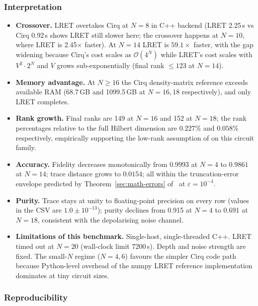 \documentclass[11pt,a4paper]{article}
\begin{document}
\subsubsection*{Interpretation}

\begin{itemize}
  \item \textbf{Crossover.} LRET overtakes Cirq at $N=8$ in C++ backend (LRET 2.25\,s
        vs Cirq 0.92\,s shows LRET still slower here; the crossover happens at
        $N\!=\!10$, where LRET is 2.45$\times$ faster). At $N=14$ LRET is
        $59.1\times$ faster, with the gap widening because Cirq's cost scales as
        $\mathcal{O}(4^N)$ while LRET's cost scales with $V^2 \cdot 2^N$ and $V$
        grows sub-exponentially (final rank $\le 123$ at $N=14$).
  \item \textbf{Memory advantage.} At $N \ge 16$ the Cirq density-matrix reference
        exceeds available RAM (68.7\,GB and 1099.5\,GB at $N=16,18$ respectively),
        and only LRET completes.
  \item \textbf{Rank growth.} Final ranks are 149 at $N=16$ and 152 at $N=18$; the
        rank percentages relative to the full Hilbert dimension are $0.227\%$ and
        $0.058\%$ respectively, empirically supporting the low-rank assumption of
        \cite{chen2021lret} on this circuit family.
  \item \textbf{Accuracy.} Fidelity decreases monotonically from $0.9993$ at $N=4$
        to $0.9861$ at $N=14$; trace distance grows to $0.0154$; all within the
        truncation-error envelope predicted by Theorem~\ref{sec:math-errors}
        of~\cite{chen2021lret} at $\varepsilon = 10^{-4}$.
  \item \textbf{Purity.} Trace stays at unity to floating-point precision on every
        row (values in the CSV are $1.0 \pm 10^{-13}$); purity declines from 0.915
        at $N=4$ to 0.691 at $N=18$, consistent with the depolarising noise channel.
  \item \textbf{Limitations of this benchmark.} Single-host, single-threaded C++.
        LRET timed out at $N = 20$ (wall-clock limit 7200\,s). Depth and noise strength
        are fixed. The small-$N$ regime ($N=4,6$) favours the simpler Cirq code path
        because Python-level overhead of the numpy LRET reference implementation
        dominates at tiny circuit sizes.
\end{itemize}

\subsubsection*{Reproducibility}
\end{document}
